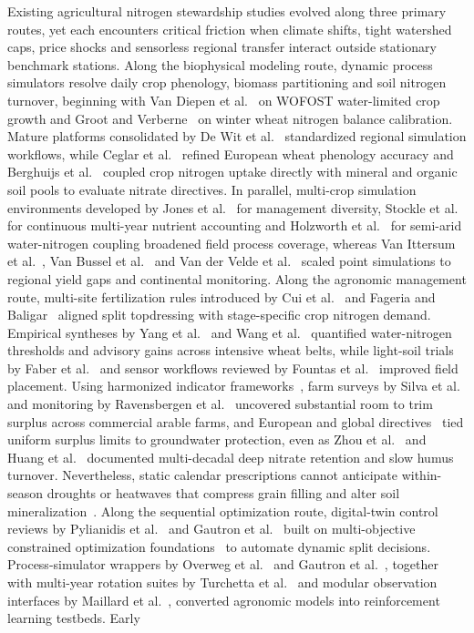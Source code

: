 \documentclass[11pt,a4paper]{article}
\begin{document}
Existing agricultural nitrogen stewardship studies evolved along three primary routes, yet each encounters critical friction when climate shifts, tight watershed caps, price shocks and sensorless regional transfer interact outside stationary benchmark stations. Along the biophysical modeling route, dynamic process simulators resolve daily crop phenology, biomass partitioning and soil nitrogen turnover, beginning with Van Diepen et al.~\citep{vandiepen1989} on WOFOST water-limited crop growth and Groot and Verberne~\citep{groot1991} on winter wheat nitrogen balance calibration. Mature platforms consolidated by De Wit et al.~\citep{dewit2019} standardized regional simulation workflows, while Ceglar et al.~\citep{ceglar2019} refined European wheat phenology accuracy and Berghuijs et al.~\citep{berghuijs2024} coupled crop nitrogen uptake directly with mineral and organic soil pools to evaluate nitrate directives. In parallel, multi-crop simulation environments developed by Jones et al.~\citep{jones2003} for management diversity, Stockle et al.~\citep{stockle2003} for continuous multi-year nutrient accounting and Holzworth et al.~\citep{holzworth2014} for semi-arid water-nitrogen coupling broadened field process coverage, whereas Van Ittersum et al.~\citep{vanittersum2013}, Van Bussel et al.~\citep{vanbussel2015} and Van der Velde et al.~\citep{vandervelde2019} scaled point simulations to regional yield gaps and continental monitoring. Along the agronomic management route, multi-site fertilization rules introduced by Cui et al.~\citep{cui2010} and Fageria and Baligar~\citep{fageria2005} aligned split topdressing with stage-specific crop nitrogen demand. Empirical syntheses by Yang et al.~\citep{yang2022} and Wang et al.~\citep{wang2020} quantified water-nitrogen thresholds and advisory gains across intensive wheat belts, while light-soil trials by Faber et al.~\citep{faber2021} and sensor workflows reviewed by Fountas et al.~\citep{fountas2015} improved field placement. Using harmonized indicator frameworks~\citep{norton2015}, farm surveys by Silva et al.~\citep{silva2021} and monitoring by Ravensbergen et al.~\citep{ravensbergen2024} uncovered substantial room to trim surplus across commercial arable farms, and European and global directives~\citep{eu2016,fao2019,klages2020} tied uniform surplus limits to groundwater protection, even as Zhou et al.~\citep{zhou2016} and Huang et al.~\citep{huang2007} documented multi-decadal deep nitrate retention and slow humus turnover. Nevertheless, static calendar prescriptions cannot anticipate within-season droughts or heatwaves that compress grain filling and alter soil mineralization~\citep{altenbach2003,iizumi2016}. Along the sequential optimization route, digital-twin control reviews by Pylianidis et al.~\citep{pylianidis2021} and Gautron et al.~\citep{gautron2022a} built on multi-objective constrained optimization foundations~\citep{censor1977,roijers2013,achiam2017} to automate dynamic split decisions. Process-simulator wrappers by Overweg et al.~\citep{overweg2021} and Gautron et al.~\citep{gautron2022b}, together with multi-year rotation suites by Turchetta et al.~\citep{turchetta2022} and modular observation interfaces by Maillard et al.~\citep{maillard2023}, converted agronomic models into reinforcement learning testbeds. Early 
\end{document}
